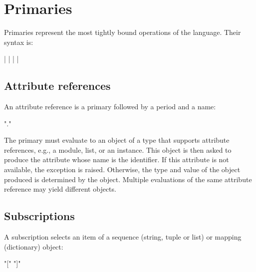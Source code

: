 \section{Primaries\label{primaries}}

Primaries represent the most tightly bound operations of the language.
Their syntax is:

\begin{productionlist}
             { | 
              |  |  | }
\end{productionlist}


\subsection{Attribute references\label{attribute-references}}

An attribute reference is a primary followed by a period and a name:

\begin{productionlist}
             { "." }
\end{productionlist}

The primary must evaluate to an object of a type that supports
attribute references, e.g., a module, list, or an instance.  This
object is then asked to produce the attribute whose name is the
identifier.  If this attribute is not available, the exception
 is raised.
Otherwise, the type and value of the object produced is determined by
the object.  Multiple evaluations of the same attribute reference may
yield different objects.


\subsection{Subscriptions\label{subscriptions}}

A subscription selects an item of a sequence (string, tuple or list)
or mapping (dictionary) object:

\begin{productionlist}
             { "["  "]"}
\end{productionlist}

